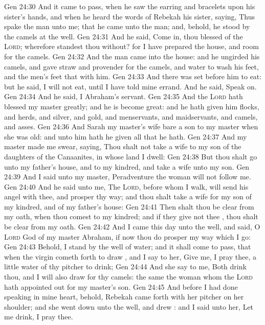 \vs Gen 24:30 And it came to pass, when he saw the earring and bracelets upon his sister's hands, and when he heard the words of Rebekah his sister, saying, Thus spake the man unto me; that he came unto the man; and, behold, he stood by the camels at the well.
\vs Gen 24:31 And he said, Come in, thou blessed of the \textsc{Lord}; wherefore standest thou without? for I have prepared the house, and room for the camels.
\vs Gen 24:32 And the man came into the house: and he ungirded his camels, and gave straw and provender for the camels, and water to wash his feet, and the men's feet that  with him.
\vs Gen 24:33 And there was set  before him to eat: but he said, I will not eat, until I have told mine errand. And he said, Speak on.
\vs Gen 24:34 And he said, I  Abraham's servant.
\vs Gen 24:35 And the \textsc{Lord} hath blessed my master greatly; and he is become great: and he hath given him flocks, and herds, and silver, and gold, and menservants, and maidservants, and camels, and asses.
\vs Gen 24:36 And Sarah my master's wife bare a son to my master when she was old: and unto him hath he given all that he hath.
\vs Gen 24:37 And my master made me swear, saying, Thou shalt not take a wife to my son of the daughters of the Canaanites, in whose land I dwell:
\vs Gen 24:38 But thou shalt go unto my father's house, and to my kindred, and take a wife unto my son.
\vs Gen 24:39 And I said unto my master, Peradventure the woman will not follow me.
\vs Gen 24:40 And he said unto me, The \textsc{Lord}, before whom I walk, will send his angel with thee, and prosper thy way; and thou shalt take a wife for my son of my kindred, and of my father's house:
\vs Gen 24:41 Then shalt thou be clear from  my oath, when thou comest to my kindred; and if they give not thee , thou shalt be clear from my oath.
\vs Gen 24:42 And I came this day unto the well, and said, O \textsc{Lord} God of my master Abraham, if now thou do prosper my way which I go:
\vs Gen 24:43 Behold, I stand by the well of water; and it shall come to pass, that when the virgin cometh forth to draw , and I say to her, Give me, I pray thee, a little water of thy pitcher to drink;
\vs Gen 24:44 And she say to me, Both drink thou, and I will also draw for thy camels:  the same  the woman whom the \textsc{Lord} hath appointed out for my master's son.
\vs Gen 24:45 And before I had done speaking in mine heart, behold, Rebekah came forth with her pitcher on her shoulder; and she went down unto the well, and drew : and I said unto her, Let me drink, I pray thee.
